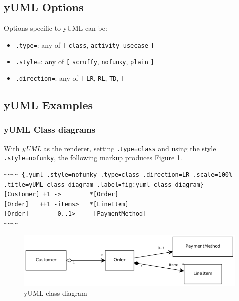 \documentclass[]{article}
\begin{document}
\subsection{yUML Options}\label{yuml-options}

Options specific to yUML can be:

\begin{itemize}
\itemsep1pt\parskip0pt
\item
  \texttt{.type=}: any of \texttt{{[}} \texttt{class},
  \texttt{activity}, \texttt{usecase} \texttt{{]}}
\item
  \texttt{.style=}: any of \texttt{{[}} \texttt{scruffy},
  \texttt{nofunky}, \texttt{plain} \texttt{{]}}
\item
  \texttt{.direction=}: any of \texttt{{[}} \texttt{LR}, \texttt{RL},
  \texttt{TD}, \texttt{{]}}
\end{itemize}

\subsection{yUML Examples}\label{yuml-examples}

\subsubsection{yUML Class diagrams}\label{yuml-class-diagrams}

With \emph{yUML} as the renderer, setting \texttt{.type=class} and using
the style \texttt{.style=nofunky}, the following markup produces Figure
\ref{fig:yuml-class-diagram}.

\scriptsize

\begin{verbatim}
~~~~ {.yuml .style=nofunky .type=class .direction=LR .scale=100% .title=yUML class diagram .label=fig:yuml-class-diagram}
[Customer] +1 ->        *[Order]
[Order]   ++1 -items>   *[LineItem]
[Order]       -0..1>     [PaymentMethod]
~~~~
\end{verbatim}

\normalsize

\begin{figure}[htbp]
\centering
\includegraphics{tmp/ppp-render-_6_eB/image-6.png}
\caption{yUML class diagram\label{fig:yuml-class-diagram}}
\end{figure}
\end{document}
